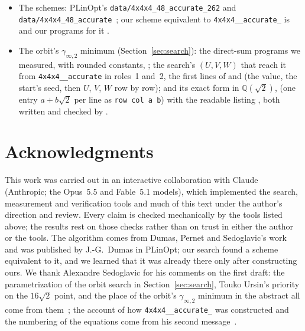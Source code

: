 \documentclass[11pt]{article}
\theoremstyle{remark}
\newcommand{\Q}{\mathbb{Q}}
\newcommand{\ginf}{\gamma_{\infty,2}}
\newcommand{\acc}{\texttt{4x4x4\_\allowbreak 48\_\allowbreak accurate}\xspace}
\newcommand{\acct}{\texttt{4x4x4\_\allowbreak 48\_\allowbreak accurate\_\allowbreak 262}\xspace}
\begin{document}
\begin{itemize}
   and its
  best programs in .
\item The schemes: PLinOpt's \texttt{data/4x4x4\_48\_accurate\_262} and
  \texttt{data/4x4x4\_48\_accurate}~\cite{PLinOpt}; our scheme equivalent to \acct
  is  and our programs for it
  .
\item The orbit's $\ginf$ minimum (Section~\ref{sec:search}): the
  direct-sum programs we measured, with rounded constants,
  ; the search's $(U,V,W)$
  that reach it from \acc in roles~1 and~2, the first lines of
   and 
  (the value, the start's seed, then $U$, $V$, $W$ row by row); and its
  exact form in $\Q(\sqrt2)$, 
  (one entry $a+b\sqrt2$ per line as \texttt{row col a b}) with the
  readable listing , both written and checked by
  .
\end{itemize}

\section*{Acknowledgments}

This work was carried out in an interactive collaboration with Claude
(Anthropic; the Opus~5.5 and Fable~5.1 models), which implemented the search,
measurement and verification tools and much of this text under the
author's direction and review.  Every claim is checked mechanically by
the tools listed above; the results rest on those checks rather than on
trust in either the author or the tools.  The algorithm comes from
Dumas, Pernet and Sedoglavic's work and was published by J.-G.~Dumas in
PLinOpt; our search found a scheme equivalent to it, and we learned
that it was already there only after constructing ours.  We thank
Alexandre Sedoglavic for his comments on the first draft: the
parametrization of the orbit search in Section~\ref{sec:search}, Touko
Ursin's priority on the $16\sqrt2$ point, and the place of the orbit's
$\ginf$ minimum in the abstract all come from them~\cite{Sedoglavic26};
the account of how \acct was constructed and the numbering of the
equations come from his second message~\cite{Sedoglavic26b}.
\end{document}
